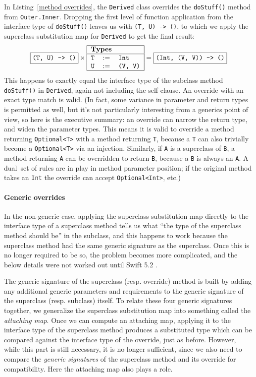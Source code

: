 \documentclass[a4paper,headsepline,bibliography=totoc,toc=flat,fleqn,twoside=semi]{scrbook}
\theoremstyle{definition}
\theoremstyle{definition}
\theoremstyle{definition}
\newcommand{\ttbox}[1]{\boxed{\mbox{\vphantom{pI\texttt{pI}}\texttt{#1}}}}
\newcommand{\SubMap}[1]{\begin{tabular}{|lll|}
\hline
\multicolumn{3}{|l|}{\textbf{Types}}\\
\hline
#1\\
\hline
\end{tabular}}
\newcommand{\SubType}[2]{\texttt{#1}&$:=$&\texttt{#2}}
\begin{document}
In Listing~\ref{method overrides}, the \texttt{Derived} class overrides the \texttt{doStuff()} method from \texttt{Outer.Inner}. Dropping the first level of function application from the interface type of \texttt{doStuff()} leaves us with \texttt{(T, U) -> ()}, to which we apply the superclass substitution map for \texttt{Derived} to get the final result:
\[
\ttbox{(T, U) -> ()} \times
\SubMap{
\SubType{T}{Int}\\
\SubType{U}{(V, V)}
} =
\ttbox{(Int, (V, V)) -> ()}
\]
This happens to exactly equal the interface type of the subclass method \texttt{doStuff()} in \texttt{Derived}, again not including the self clause. An override with an exact type match is valid. (In fact, some variance in parameter and return types is permitted as well, but it's not particularly interesting from a generics point of view, so here is the executive summary: an override can narrow the return type, and widen the parameter types. This means it is valid to override a method returning \texttt{Optional<T>} with a method returning \texttt{T}, because a \texttt{T} can also trivially become a \texttt{Optional<T>} via an injection. Similarly, if \texttt{A} is a superclass of \texttt{B}, a method returning \texttt{A} can be overridden to return \texttt{B}, because a \texttt{B} is always an \texttt{A}. A dual set of rules are in play in method parameter position; if the original method takes an \texttt{Int} the override can accept \texttt{Optional<Int>}, etc.)

\paragraph{Generic overrides}
In the non-generic case, applying the superclass substitution map directly to the interface type of a superclass method tells us what ``the type of the superclass method should be'' in the subclass, and this happens to work because the superclass method had the same generic signature as the superclass. Once this is no longer required to be so, the problem becomes more complicated, and the below details were not worked out until Swift 5.2 \cite{sr4206}.

The generic signature of the superclass (resp. override) method is built by adding any additional generic parameters and requirements to the generic signature of the superclass (resp. subclass) itself. To relate these four generic signatures together, we generalize the superclass substitution map into something called the \emph{attaching map}. Once we can compute an attaching map, applying it to the interface type of the superclass method produces a substituted type which can be compared against the interface type of the override, just as before. However, while this part is still necessary, it is no longer sufficient, since we also need to compare the \emph{generic signatures} of the superclass method and its override for compatibility. Here the attaching map also plays a role.
\end{document}
